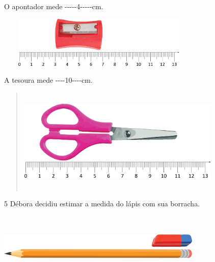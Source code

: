 \begin{escolha}
\begin{escolha}
\item
  O apontador mede -\/-\/-\/-\/-4-\/-\/-\/-\/-cm.

  \includegraphics[width=3.87534in,height=0.95842in]{media/image44.png}


\item
  A tesoura mede -\/-\/-\/-10-\/-\/-\/-cm.

  \begin{quote}
  \includegraphics[width=3.81700in,height=1.97517in]{media/image45.png}
\end{quote}


\end{escolha}


\num{5} Débora decidiu estimar a medida do lápis com sua borracha.

\includegraphics[width=3.84200in,height=1.23344in]{media/image46.png}


\end{escolha}
